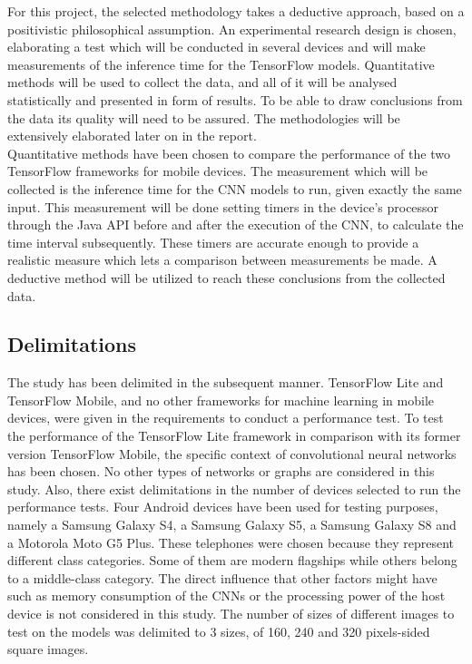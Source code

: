 For this project, the selected methodology takes a deductive approach, based on a positivistic philosophical assumption. An experimental research design is chosen, elaborating a test which will be conducted in several devices and will make measurements of the inference time for the TensorFlow models. Quantitative methods will be used to collect the data, and all of it will be analysed statistically and presented in form of results. To be able to draw conclusions from the data its quality will need to be assured. The methodologies will be extensively elaborated later on in the report. \\

Quantitative methods have been chosen to compare the performance of the two TensorFlow frameworks for mobile devices. The measurement which will be collected is the inference time for the CNN models to run, given exactly the same input. This measurement will be done setting timers in the device's processor through the Java API before and after the execution of the CNN, to calculate the time interval subsequently. These timers are accurate enough to provide a realistic measure which lets a comparison between measurements be made. A deductive method will be utilized to reach these conclusions from the collected data. \\


\subsection{Delimitations}
The study has been delimited in the subsequent manner. TensorFlow Lite and TensorFlow Mobile, and no other frameworks for machine learning in mobile devices, were given in the requirements to conduct a performance test. To test the performance of the TensorFlow Lite framework in comparison with its former version TensorFlow Mobile, the specific context of convolutional neural networks has been chosen. No other types of networks or graphs are considered in this study. Also, there exist delimitations in the number of devices selected to run the performance tests. Four Android devices have been used for testing purposes, namely a Samsung Galaxy S4, a Samsung Galaxy S5, a Samsung Galaxy S8 and a Motorola Moto G5 Plus. These telephones were chosen because they represent different class categories. Some of them are modern flagships while others belong to a middle-class category. The direct influence that other factors might have such as memory consumption of the CNNs or the processing power of the host device is not considered in this study. The number of sizes of different images to test on the models was delimited to 3 sizes, of 160, 240 and 320 pixels-sided square images. \\

